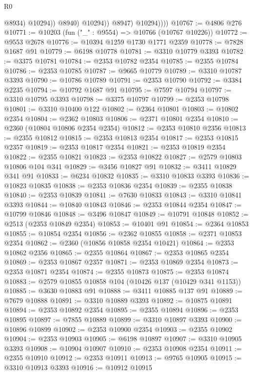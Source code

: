 \begin{lexlean}{R0}
\begin{coremodule}
                          @8934)
                        @10294))
                    @8940)
                  @10294))
              @8947)
            @10294))))
@10767 := @4806 @276
@10771 := @10203 (fun ("_" : @9554) => @10766 (@10767 @10226))
@10772 := @9553 @2678
@10776 := @10394 @1259 @1730 @1771 @2359
@10778 := @7828 @1687 @91
@10779 := @6198 @10778
@10781 := @3310 @10779 @3393
@10782 := @3375 @10781
@10784 := @2353 @10782 @2354
@10785 := @2355 @10784
@10786 := @2353 @10785
@10787 := @9665 @10779
@10789 := @3310 @10787 @3393
@10790 := @10786 @10789
@10791 := @2353 @10790
@10792 := @3384 @2235
@10794 := @10792 @1687 @91
@10795 := @7597 @10794
@10797 := @3310 @10795 @3393
@10798 := @3375 @10797
@10799 := @2353 @10798
@10801 := @3310 @10400 @122
@10802 := @2364 @10801
@10803 := @10802 @2354
@10804 := @2362 @10803
@10806 := @2371 @10801 @2354
@10810 := @2360 (@10804 @10806 @2354 @2354)
@10812 := @2353 @10810 @2356
@10813 := @2355 @10812
@10815 := @2353 @10813 @2354
@10817 := @2353 @10815 @2357
@10819 := @2353 @10817 @2354
@10821 := @2353 @10819 @2354
@10822 := @2355 @10821
@10823 := @2353 @10822
@10827 := @2579 @10803 @10806 @104 @341
@10829 := @3456 @10827 @91
@10832 := @3411 @10829 @341 @91
@10833 := @6234 @10832
@10835 := @3310 @10833 @3393
@10836 := @10823 @10835
@10838 := @2353 @10836 @2354
@10839 := @2355 @10838
@10840 := @2353 @10839
@10841 := @7630 @10833
@10843 := @3310 @10841 @3393
@10844 := @10840 @10843
@10846 := @2353 @10844 @2354
@10847 := @10799 @10846
@10848 := @3496 @10847
@10849 := @10791 @10848
@10852 := @2513 (@2353 @10849 @2354)
@10853 := @10401 @91
@10854 := @2364 @10853
@10855 := @10854 @2354
@10856 := @2362 @10855
@10858 := @2371 @10853 @2354
@10862 := @2360 (@10856 @10858 @2354 @10421)
@10864 := @2353 @10862 @2356
@10865 := @2355 @10864
@10867 := @2353 @10865 @2354
@10869 := @2353 @10867 @2357
@10871 := @2353 @10869 @2354
@10873 := @2353 @10871 @2354
@10874 := @2355 @10873
@10875 := @2353 @10874
@10883 := @2579 @10855 @10858 @104 (@10426 @137 (@10429 @341 @1153))
@10885 := @3630 @10883 @91
@10888 := @3411 @10885 @137 @91
@10889 := @7679 @10888
@10891 := @3310 @10889 @3393
@10892 := @10875 @10891
@10894 := @2353 @10892 @2354
@10895 := @2355 @10894
@10896 := @2353 @10895
@10897 := @7855 @10889
@10899 := @3310 @10897 @3393
@10900 := @10896 @10899
@10902 := @2353 @10900 @2354
@10903 := @2355 @10902
@10904 := @2353 @10903
@10905 := @6198 @10897
@10907 := @3310 @10905 @3393
@10908 := @10904 @10907
@10910 := @2353 @10908 @2354
@10911 := @2355 @10910
@10912 := @2353 @10911
@10913 := @9765 @10905
@10915 := @3310 @10913 @3393
@10916 := @10912 @10915

\end{coremodule}
\end{lexlean}
